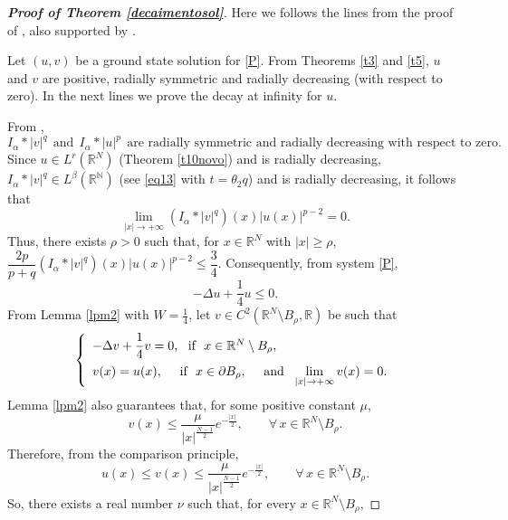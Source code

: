 \documentclass[12pt,a4paper]{article}
\numberwithin{equation}{section}
\begin{document}
\begin{proof}[\textbf{Proof of Theorem \ref{decaimentosol}}] Here we follows the lines from the proof of \cite[Proposition 6.3]{Moroz2013}, also supported by \cite[Lemma 2.2]{Lieb1983}.

    
    \medbreak
    
      Let $(u, v)$ be a ground state solution for \eqref{P}. From Theorems \ref{t3} and \ref{t5}, $u$ and $v$ are positive, radially symmetric and radially decreasing (with respect to zero). In the next lines we prove the decay at infinity for $u$.
     
     From \cite[Lemma 2.2]{Lieb1983}, 
     \begin{equation}\label{nucdecres}
I_{\alpha}\ast|v|^{q} \ \ \text{and} \ \ I_{\alpha}\ast |u|^p \ \ \text{are radially symmetric and radially decreasing with respect to zero.}
     \end{equation} 
    Since $u\in L^{r}(\mathbb{R}^N)$ (Theorem \ref{t10novo}) and is radially decreasing, $I_{\alpha}\ast|v|^{q} \in L^{\beta}(\mathbb{R^N})$ (see \eqref{eq13} with $t=\theta_2q$) and is radially decreasing, it follows that
    $$
    \lim\limits_{|x|\rightarrow + \infty} (I_\alpha \ast |v|^q)(x)|u(x)|^{p-2}=0.
    $$
    Thus, there exists $\rho > 0$ such that, for $x \in \mathbb{R}^N$ with $|x|\geq \rho$, 
    $
    \dfrac{2p}{p+q}(I_\alpha \ast |v|^q)(x)|u(x)|^{p-2} \leq \dfrac{3}{4}.
    $
    Consequently, from system \eqref{P},
    $$
    -\Delta u + \dfrac{1}{4}u \leq 0.
    $$
    From Lemma \ref{lpm2} with $W=\frac{1}{4}$, let $v \in C^2(\mathbb{R}^N \setminus B_\rho, \mathbb{R})$ be such that
    $$
    \left\{ \begin{array}{lll}
        -\Delta v + \dfrac{1}{4}v = 0, \mbox{ \ if \ } x \in \mathbb{R}^N \setminus B_\rho, \vspace{5pt}\\
        v(x) = u(x),  \ \   \mbox{ \ if \ } x \in \partial B_\rho, \ \   \mbox{ \ and \ }\lim\limits_{|x|\rightarrow + \infty}v(x) = 0.
    \end{array} \right.
    $$
    Lemma \ref{lpm2} also guarantees that, for some positive constant $\mu$,
    $$
    v(x) \leq \dfrac{\mu}{|x|^{\frac{N-1}{2}}}e^{-\frac{|x|}{2}}, \qquad \forall \, x \in \mathbb{R}^N \setminus B_\rho.
    $$
    Therefore, from the comparison principle,
    $$
    u(x)\leq v(x) \leq \dfrac{\mu}{|x|^{\frac{N-1}{2}}}e^{-\frac{|x|}{2}}, \qquad \forall \, x \in \mathbb{R}^N \setminus B_\rho.
    $$
    So, there exists a real number $\nu$ such that, for every $x \in \mathbb{R}^N \setminus B_\rho$,

\end{proof}
\end{document}
